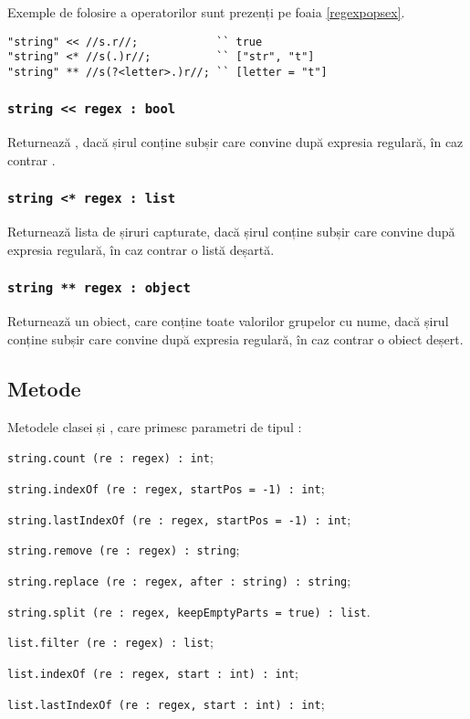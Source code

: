 Exemple de folosire a operatorilor sunt prezenți pe foaia \ref{regexpopsex}.

\begin{lstlisting}[caption=Operații cu expresii regulare, label=regexpopsex]
"string" << //s.r//;            `` true
"string" <* //s(.)r//;          `` ["str", "t"]
"string" ** //s(?<letter>.)r//; `` [letter = "t"]
\end{lstlisting}

\subsubsection{\lstinline|string << regex : bool|}

Returnează \true{}, dacă șirul conține subșir care convine după expresia regulară, în caz contrar \false{}.

\subsubsection{\lstinline|string <* regex : list|}

Returnează lista de șiruri capturate, dacă șirul conține subșir care convine după expresia regulară, în caz contrar o listă deșartă.

\subsubsection{\lstinline|string ** regex : object|}

Returnează un obiect, care conține toate valorilor grupelor cu nume, dacă șirul conține subșir care convine după expresia regulară, în caz contrar o obiect deșert.


\subsection{Metode}

Metodele clasei \str{} și \listtype, care primesc parametri de tipul \regex{}:
\begin{icItems}
\item
\lstinline|string.count (re : regex) : int|;
\item
\lstinline|string.indexOf (re : regex, startPos = -1) : int|;
\item
\lstinline|string.lastIndexOf (re : regex, startPos = -1) : int|;
\item
\lstinline|string.remove (re : regex) : string|;
\item 
\lstinline|string.replace (re : regex, after : string) : string|;
\item
\lstinline|string.split (re : regex, keepEmptyParts = true) : list|.
\item
\lstinline|list.filter (re : regex) : list|;
\item
\lstinline|list.indexOf (re : regex, start : int) : int|;
\item
\lstinline|list.lastIndexOf (re : regex, start : int) : int|;
\end{icItems}


